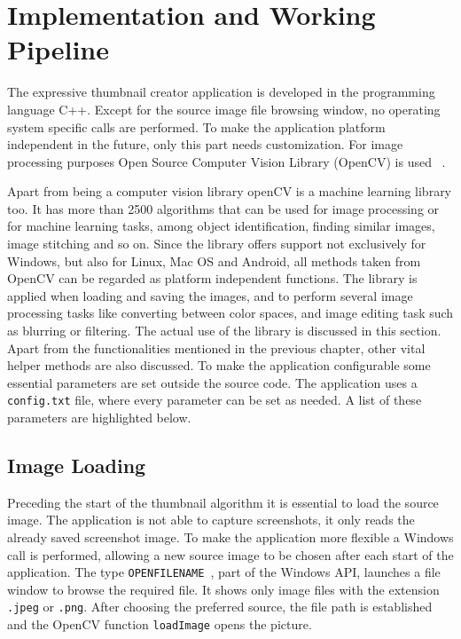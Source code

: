 \documentclass[draft,final]{vutinfth} %
\begin{document}
	\chapter{Implementation and Working Pipeline}
	\label{implementation}
	The expressive thumbnail creator application is developed in the programming language C++.
	Except for the source image file browsing window, no operating system specific calls are performed.
	To make the application platform independent in the future, only this part needs customization.
	For image processing purposes Open Source Computer Vision Library (OpenCV) is used ~\cite{opencv_library}.\par 
	Apart from being a computer vision library openCV is a machine learning library too.     
	It has more than 2500 algorithms that can be used for image processing or for machine learning tasks, among object identification, finding similar images, image stitching and so on.
	Since the library offers support not exclusively for Windows, but also for Linux, Mac OS and Android, all methods taken from OpenCV can be regarded as platform independent functions.
	The library is applied when loading and saving the images, and to perform several image processing tasks like converting between color spaces, and image editing task such as blurring or filtering.
	The actual use of the library is discussed in this section.
	Apart from the functionalities mentioned in the previous chapter, other vital helper methods are also discussed.
	To make the application configurable some essential parameters are set outside the source code. 
	The application uses a \texttt{config.txt} file, where every parameter can be set as needed.
	A list of these parameters are highlighted below.\par
	
	\section{Image Loading}
	Preceding the start of the thumbnail algorithm it is essential to load the source image.
	The application is not able to capture screenshots, it only reads the already saved screenshot image.
	To make the application more flexible a Windows call is performed, allowing a new source image to be chosen after each start of the application.
	The type \texttt{OPENFILENAME}~\cite{openfilename}, part of the Windows API, launches a file window to browse the required file.
	It shows only image files with the extension \texttt{.jpeg} or \texttt{.png}.
	After choosing the preferred source, the file path is established and the OpenCV function \texttt{loadImage} opens the picture.
	
\end{document}
